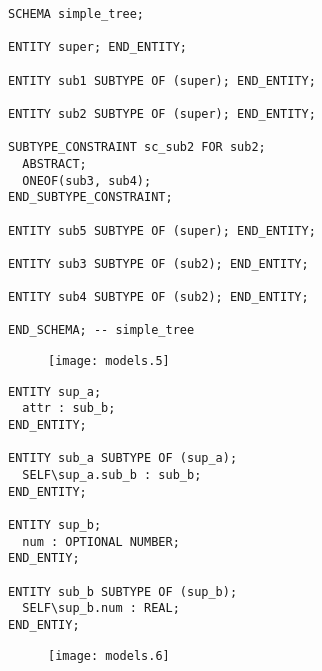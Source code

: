 \begin{remarks}
\remintro
{}
\begin{verbatim}
SCHEMA simple_tree;

ENTITY super; END_ENTITY;

ENTITY sub1 SUBTYPE OF (super); END_ENTITY;

ENTITY sub2 SUBTYPE OF (super); END_ENTITY;

SUBTYPE_CONSTRAINT sc_sub2 FOR sub2;
  ABSTRACT;
  ONEOF(sub3, sub4);
END_SUBTYPE_CONSTRAINT;

ENTITY sub5 SUBTYPE OF (super); END_ENTITY;

ENTITY sub3 SUBTYPE OF (sub2); END_ENTITY;

ENTITY sub4 SUBTYPE OF (sub2); END_ENTITY;

END_SCHEMA; -- simple_tree
\end{verbatim}

\remend
\end{remarks}


\begin{figure}[hp]
\centering
\texttt{[image: models.5]}

\vspace{\afttit}

\end{figure}


\begin{remarks}
\remintro
{}

\begin{verbatim}
ENTITY sup_a;
  attr : sub_b;
END_ENTITY;

ENTITY sub_a SUBTYPE OF (sup_a);
  SELF\sup_a.sub_b : sub_b;
END_ENTITY;

ENTITY sup_b;
  num : OPTIONAL NUMBER;
END_ENTIY;

ENTITY sub_b SUBTYPE OF (sup_b);
  SELF\sup_b.num : REAL;
END_ENTIY;
\end{verbatim}


\remend
\end{remarks}


\begin{figure}[hp]
\centering
\texttt{[image: models.6]}

\vspace{\afttit}

\end{figure}



